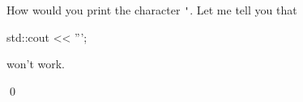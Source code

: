 How would you print the character \verb!'!. Let me tell you that

\begin{console}

std::cout << ''';

\end{console}

won't work.

\qed

